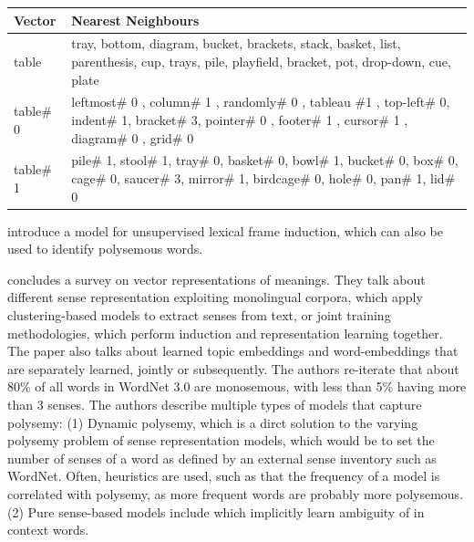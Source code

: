 \documentclass[a4paper,12pt,twoside,openright]{report}
\begin{document}
\begin{table}[htbp]
    \centering
    \begin{tabularx}{\textwidth}{p{50pt}|b}
    \toprule
      {\textbf{Vector}} & {\textbf{Nearest Neighbours}}  \\ \midrule
        table & tray, bottom, diagram, bucket, brackets, stack, basket, list, parenthesis, cup, trays, pile, playfield, bracket, pot, drop-down, cue, plate \\ \hline
        table\# 0 & leftmost\# 0 , column\# 1 , randomly\# 0 , tableau \#1 , top-left\# 0, indent\# 1, bracket\# 3, pointer\# 0 , footer\# 1 , cursor\# 1 , diagram\# 0 , grid\# 0      \\ \hline
        table\# 1 & pile\# 1, stool\# 1, tray\# 0, basket\# 0, bowl\# 1, bucket\# 0, box\# 0, cage\# 0, saucer\# 3, mirror\# 1, birdcage\# 0, hole\# 0, pan\# 1, lid\# 0    \\ \hline
    \end{tabularx}
\end{table}

\cite{qasemizadeh19} introduce a model for unsupervised lexical frame induction, which can also be used to identify polysemous words.

\cite{camachocollados18} concludes a survey on vector representations of meanings.
They talk about different sense representation exploiting monolingual corpora, which apply clustering-based models to extract senses from text, or joint training methodologies, which perform induction and representation learning together.
The paper also talks about learned topic embeddings and word-embeddings that are separately learned, jointly or subsequently.
The authors re-iterate that about 80\% of all words in WordNet  3.0 are monosemous, with less than 5\% having more than 3 senses.
The authors describe multiple types of models that capture polysemy: 
(1) Dynamic polysemy, which is a dirct solution to the varying polysemy problem of sense representation models, which would be to set the number of senses of a word as defined by an external sense inventory such as WordNet. 
Often, heuristics are used, such as that the frequency of a model is correlated with polysemy, as more frequent words are probably more polysemous.
(2) Pure sense-based models include which implicitly learn ambiguity of in context words.
\end{document}
